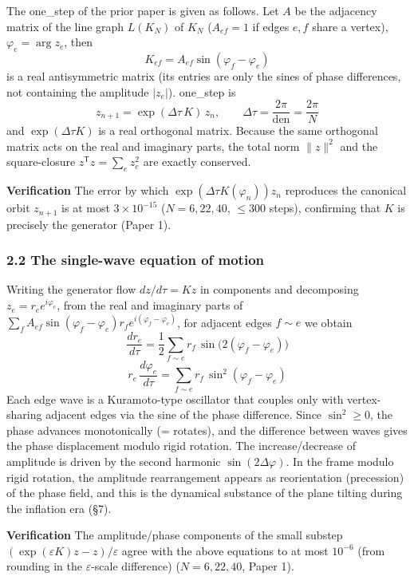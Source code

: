 \documentclass[
  a4paper,
]{ltjsarticle}
\begin{document}
The one\_step of the prior paper is given as follows. Let \(A\) be the
adjacency matrix of the line graph \(L(K_N)\) of \(K_N\) (\(A_{ef}=1\)
if edges \(e,f\) share a vertex), \(\varphi_e=\arg z_e\), then
\[K_{ef}=A_{ef}\sin(\varphi_f-\varphi_e)\] is a real antisymmetric
matrix (its entries are only the sines of phase differences, not
containing the amplitude \(|z_e|\)). one\_step is
\[z_{n+1}=\exp(\Delta\tau\,K)\,z_n,\qquad \Delta\tau=\frac{2\pi}{\mathrm{den}}=\frac{2\pi}{N}\]
and \(\exp(\Delta\tau K)\) is a real orthogonal matrix. Because the same
orthogonal matrix acts on the real and imaginary parts, the total norm
\(\|z\|^2\) and the square-closure \(z^{\mathsf T}z=\sum_e z_e^2\) are
exactly conserved.

\textbf{Verification} The error by which
\(\exp(\Delta\tau K(\varphi_n))z_n\) reproduces the canonical orbit
\(z_{n+1}\) is at most \(3\times10^{-15}\) (\(N=6,22,40\), \(\le300\)
steps), confirming that \(K\) is precisely the generator (Paper 1).

\subsubsection{2.2 The single-wave equation of
motion}\label{the-single-wave-equation-of-motion}

Writing the generator flow \(dz/d\tau=Kz\) in components and decomposing
\(z_e=r_e e^{i\varphi_e}\), from the real and imaginary parts of
\(\sum_f A_{ef}\sin(\varphi_f-\varphi_e)r_f e^{i(\varphi_f-\varphi_e)}\),
for adjacent edges \(f\sim e\) we obtain
\[\boxed{\ \frac{dr_e}{d\tau}=\frac12\sum_{f\sim e}r_f\,\sin\!\big(2(\varphi_f-\varphi_e)\big)\ }\tag{amplitude}\]
\[\boxed{\ r_e\,\frac{d\varphi_e}{d\tau}=\sum_{f\sim e}r_f\,\sin^2(\varphi_f-\varphi_e)\ }\tag{phase}\]
Each edge wave is a Kuramoto-type oscillator that couples only with
vertex-sharing adjacent edges via the sine of the phase difference.
Since \(\sin^2\ge0\), the phase advances monotonically (= rotates), and
the difference between waves gives the phase displacement modulo rigid
rotation. The increase/decrease of amplitude is driven by the second
harmonic \(\sin(2\Delta\varphi)\). In the frame modulo rigid rotation,
the amplitude rearrangement appears as reorientation (precession) of the
phase field, and this is the dynamical substance of the plane tilting
during the inflation era (§7).

\textbf{Verification} The amplitude/phase components of the small
substep \((\exp(\varepsilon K)z-z)/\varepsilon\) agree with the above
equations to at most \(10^{-6}\) (from rounding in the
\(\varepsilon\)-scale difference) (\(N=6,22,40\), Paper 1).
\end{document}
